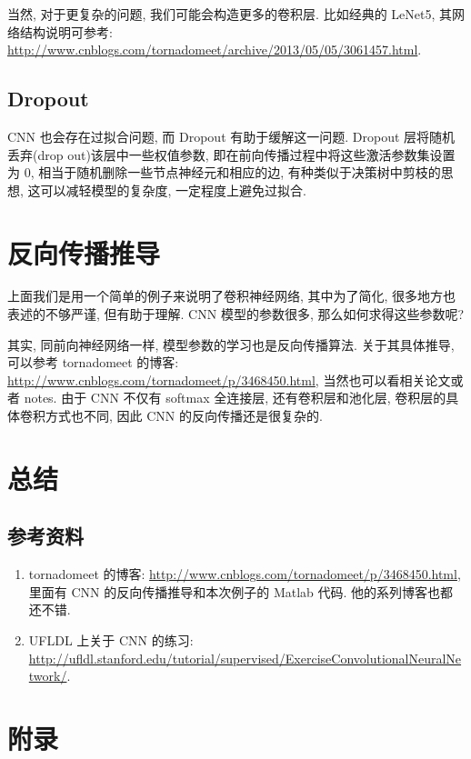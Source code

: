 \documentclass[a4paper,UTF8]{ctexart}
\theoremstyle{plain} \newtheorem{theorem}{定理}[section]
\theoremstyle{plain} \newtheorem{definition}{定义}[section]
\theoremstyle{plain} \newtheorem{lemma}{引理}[section]
\theoremstyle{plain} \newtheorem{proposition}{命题}[section]
\theoremstyle{plain} \newtheorem{example}{例}[section]
\theoremstyle{plain} \newtheorem{remark}{注}[section]
\theoremstyle{plain} \newtheorem{corollary}{推论}[section]
\begin{document}
当然, 对于更复杂的问题, 我们可能会构造更多的卷积层. 比如经典的 LeNet5, 其网络结构说明可参考: \url{http://www.cnblogs.com/tornadomeet/archive/2013/05/05/3061457.html}.

\subsection{Dropout}
CNN 也会存在过拟合问题, 而 Dropout 有助于缓解这一问题. Dropout 层将随机丢弃(drop out)该层中一些权值参数, 即在前向传播过程中将这些激活参数集设置为 0, 相当于随机删除一些节点神经元和相应的边, 有种类似于决策树中剪枝的思想, 这可以减轻模型的复杂度, 一定程度上避免过拟合.



\section{反向传播推导}
上面我们是用一个简单的例子来说明了卷积神经网络, 其中为了简化, 很多地方也表述的不够严谨, 但有助于理解. CNN 模型的参数很多, 那么如何求得这些参数呢? 

其实, 同前向神经网络一样, 模型参数的学习也是反向传播算法. 关于其具体推导, 可以参考 tornadomeet 的博客: \url{http://www.cnblogs.com/tornadomeet/p/3468450.html}, 当然也可以看相关论文或者 notes. 由于 CNN 不仅有 softmax 全连接层, 还有卷积层和池化层, 卷积层的具体卷积方式也不同, 因此 CNN 的反向传播还是很复杂的.







\section{总结}
\subsection{参考资料}
\begin{enumerate}[(1)]
\item tornadomeet 的博客: \url{http://www.cnblogs.com/tornadomeet/p/3468450.html}, 里面有 CNN 的反向传播推导和本次例子的 Matlab 代码. 他的系列博客也都还不错.

\item UFLDL 上关于 CNN 的练习: \url{http://ufldl.stanford.edu/tutorial/supervised/ExerciseConvolutionalNeuralNetwork/}.


\end{enumerate}





\newpage

\section*{附录}
\end{document}
